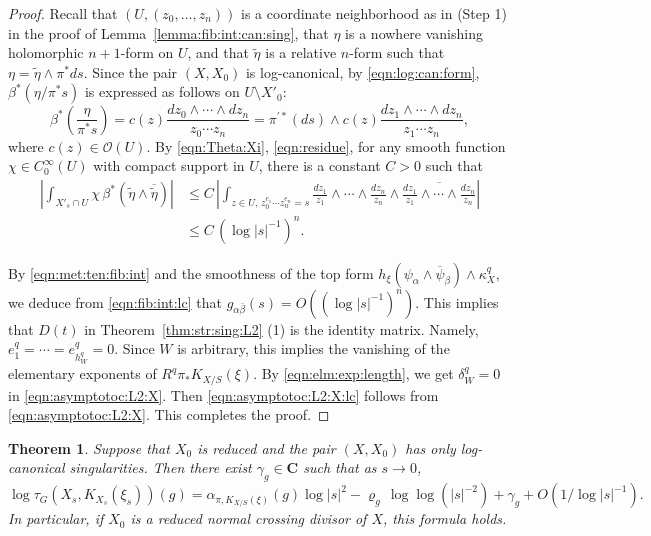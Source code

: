 \documentclass[amscd, leqno]{amsart}
\theoremstyle{plain}
\newtheorem{theorem}{Theorem}[section]
\theoremstyle{definition}
\theoremstyle{remark}
\newenvironment{pf}{\begin{proof}}{\end{proof}}
\begin{document}
\begin{pf}
Recall that $(U, (z_{0}, \ldots, z_{n}))$ is a coordinate neighborhood as in (Step 1) in the proof of Lemma~\ref{lemma:fib:int:can:sing}, 
that $\eta$ is a nowhere vanishing holomorphic $n+1$-form on $U$, and that $\widetilde{\eta}$ is a relative $n$-form such that 
$\eta = \widetilde{\eta} \wedge \pi^{*}ds$.
Since the pair $(X,X_{0})$ is log-canonical, by \eqref{eqn:log:can:form}, $\beta^{*}(\eta/\pi^{*}s)$ is expressed as follows 
on $U\setminus X'_{0}$:
\begin{equation}
\label{eqn:residue}
\beta^{*}\left(\frac{\eta}{\pi^{*}s}\right) 
= 
c(z) \frac{dz_{0}\wedge\cdots\wedge dz_{n}}{z_{0}\cdots z_{n}}
=
\pi^{\prime *}(ds) \wedge c(z) \frac{dz_{1}\wedge\cdots\wedge dz_{n}}{z_{1}\cdots z_{n}},
\end{equation}
where $c(z) \in {\mathcal O}(U)$. By \eqref{eqn:Theta:Xi}, \eqref{eqn:residue}, for any smooth function $\chi \in C_{0}^{\infty}(U)$ 
with compact support in $U$, there is a constant $C>0$ such that
\begin{equation}
\label{eqn:fib:int:lc}
\begin{aligned}
\left|\int_{X'_{s}\cap U} \chi\,\beta^{*}(\widetilde{\eta} \wedge \overline{\widetilde{\eta}})\right|
&\leq
C\,\left|
\int_{z\in U,\,z_{0}^{e_{1}}\cdots z_{n}^{e_{n}}=s}
\frac{dz_{1}}{z_{1}}\wedge\cdots\wedge\frac{dz_{n}}{z_{n}}
\wedge
\overline{\frac{dz_{1}}{z_{1}}\wedge\cdots\wedge\frac{dz_{n}}{z_{n}}}
\right|
\\
&\leq
C\,(\log |s|^{-1})^{n}.
\end{aligned}
\end{equation}
\par
By \eqref{eqn:met:ten:fib:int} and the smoothness of the top form 
$h_{\xi}(\psi_{\alpha}\wedge\overline{\psi}_{\beta})\wedge\kappa_{X}^{q}$,
we deduce from \eqref{eqn:fib:int:lc} that $g_{\alpha\bar{\beta}}(s) = O\left( (\log|s|^{-1})^{n} \right)$.
This implies that $D(t)$ in Theorem~\ref{thm:str:sing:L2} (1) is the identity matrix. Namely, $e_{1}^{q} = \cdots = e_{h_{W}^{q}}^{q} =0$.
Since $W$ is arbitrary, this implies the vanishing of the elementary exponents of $R^{q}\pi_{*}K_{X/S}(\xi)$.
By \eqref{eqn:elm:exp:length}, we get $\delta_{W}^{q} =0$ in \eqref{eqn:asymptotoc:L2:X}. 
Then \eqref{eqn:asymptotoc:L2:X:lc} follows from \eqref{eqn:asymptotoc:L2:X}. This completes the proof.
\end{pf}


\begin{theorem}
\label{thm:sing:tor:log:can}
Suppose that $X_{0}$ is reduced and the pair $(X, X_{0})$ has only log-canonical singularities. 
Then there exist $\gamma_{g} \in {\mathbf C}$ such that as $s \to 0$,
$$
\log\tau_{G}(X_{s},K_{X_{s}}(\xi_{s}))(g) 
= \alpha_{\pi,K_{X/S}(\xi)}(g) \log |s|^{2} - \varrho_{g}\,\log\log( |s|^{-2}) + \gamma_{g} + O\left(1/\log |s|^{-1} \right).
$$
In particular, if $X_{0}$ is a reduced normal crossing divisor of $X$, this formula holds.
\end{theorem}
\end{document}
